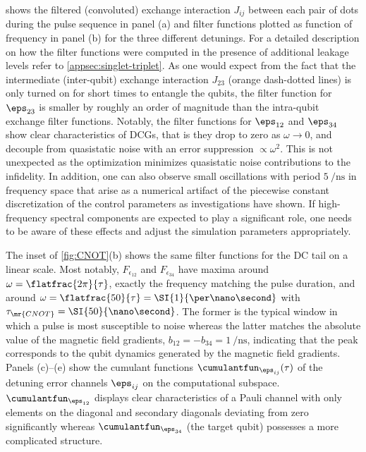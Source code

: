  shows the filtered (convoluted) exchange interaction $J_{ij}$ between each pair of dots during the pulse sequence in panel (a) and filter functions plotted as function of frequency in panel (b) for the three different detunings. For a detailed description on how the filter functions were computed in the presence of additional leakage levels refer to \cref{appsec:singlet-triplet}. As one would expect from the fact that the intermediate (inter-qubit) exchange interaction $J_{23}$ (orange dash-dotted lines) is only turned on for short times to entangle the qubits, the filter function for $\eps_{23}$ is smaller by roughly an order of magnitude than the intra-qubit exchange filter functions. Notably, the filter functions for $\eps_{12}$ and $\eps_{34}$ show clear characteristics of DCGs, that is they drop to zero as $\omega\rightarrow 0$, and decouple from quasistatic noise with an error suppression $\propto\omega^2$. This is not unexpected as the optimization minimizes quasistatic noise contributions to the infidelity. In addition, one can also observe small oscillations with period $\SI{5}{\per\nano\second}$ in frequency space that arise as a numerical artifact of the piecewise constant discretization of the control parameters as investigations have shown. If high-frequency spectral components are expected to play a significant role, one needs to be aware of these effects and adjust the simulation parameters appropriately.

The inset of \cref{fig:CNOT}(b) shows the same filter functions for the DC tail on a linear scale. Most notably, $F_{\epsilon_{12}}$ and $F_{\epsilon_{34}}$ have maxima around $\omega = \flatfrac{2\pi}{\tau}$, \ie exactly the frequency matching the pulse duration, and around $\omega = \flatfrac{50}{\tau} = \SI{1}{\per\nano\second}$ with $\tau_\mr{CNOT} = \SI{50}{\nano\second}$. The former is the typical window in which a pulse is most susceptible to noise whereas the latter matches the absolute value of the magnetic field gradients, $b_{12} = -b_{34} = \SI{1}{\per\nano\second}$, indicating that the peak corresponds to the qubit dynamics generated by the magnetic field gradients. Panels (c)--(e) show the cumulant functions $\cumulantfun_{\eps_{ij}}(\tau)$ of the detuning error channels $\eps_{ij}$ on the computational subspace. $\cumulantfun_{\eps_{12}}$ displays clear characteristics of a Pauli channel with only elements on the diagonal and secondary diagonals deviating from zero significantly whereas $\cumulantfun_{\eps_{34}}$ (the target qubit) possesses a more complicated structure.

